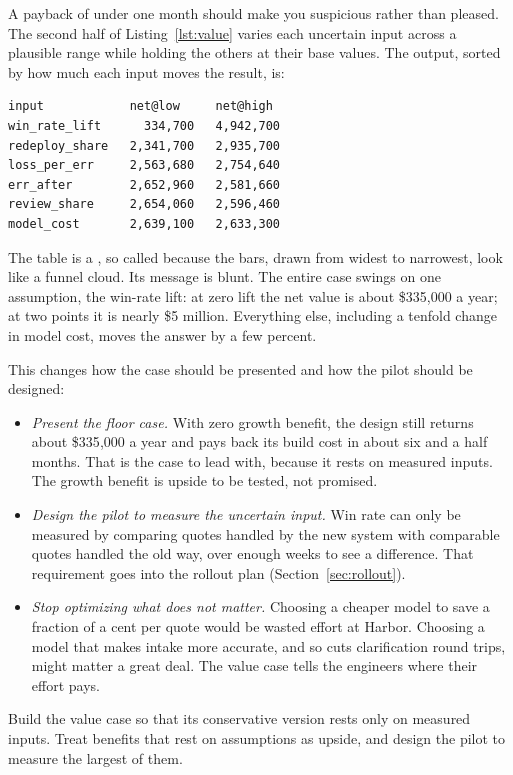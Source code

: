 A payback of under one month should make you suspicious rather than pleased. The second half of Listing~\ref{lst:value} varies each uncertain input across a plausible range while holding the others at their base values. The output, sorted by how much each input moves the result, is:

\begin{lstlisting}[language={}, numbers=none, frame=none, xleftmargin=1.5em]
input            net@low     net@high
win_rate_lift      334,700   4,942,700
redeploy_share   2,341,700   2,935,700
loss_per_err     2,563,680   2,754,640
err_after        2,652,960   2,581,660
review_share     2,654,060   2,596,460
model_cost       2,639,100   2,633,300
\end{lstlisting}

The table is a , so called because the bars, drawn from widest to narrowest, look like a funnel cloud. Its message is blunt. The entire case swings on one assumption, the win-rate lift: at zero lift the net value is about \$335{,}000 a year; at two points it is nearly \$5 million. Everything else, including a tenfold change in model cost, moves the answer by a few percent.

This changes how the case should be presented and how the pilot should be designed:
\begin{itemize}[itemsep=1pt]
  \item \emph{Present the floor case.} With zero growth benefit, the design still returns about \$335{,}000 a year and pays back its build cost in about six and a half months. That is the case to lead with, because it rests on measured inputs. The growth benefit is upside to be tested, not promised.
  \item \emph{Design the pilot to measure the uncertain input.} Win rate can only be measured by comparing quotes handled by the new system with comparable quotes handled the old way, over enough weeks to see a difference. That requirement goes into the rollout plan (Section~\ref{sec:rollout}).
  \item \emph{Stop optimizing what does not matter.} Choosing a cheaper model to save a fraction of a cent per quote would be wasted effort at Harbor. Choosing a model that makes intake more accurate, and so cuts clarification round trips, might matter a great deal. The value case tells the engineers where their effort pays.
\end{itemize}

\begin{principle}
Build the value case so that its conservative version rests only on measured inputs. Treat benefits that rest on assumptions as upside, and design the pilot to measure the largest of them.
\end{principle}

